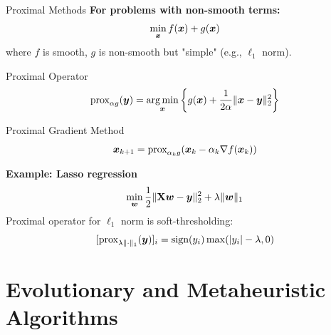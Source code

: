 \documentclass[aspectratio=169]{beamer}
\begin{document}
\begin{frame}{Proximal Methods}
  \textbf{For problems with non-smooth terms:}
  $$\min_{\boldsymbol{x}} f(\boldsymbol{x}) + g(\boldsymbol{x})$$
  where $f$ is smooth, $g$ is non-smooth but "simple" (e.g., $\ell_1$ norm).

  \vspace{0.5em}

  \begin{definitionbox}{Proximal Operator}
    $$\text{prox}_{\alpha g}(\boldsymbol{y}) = \operatorname*{arg\,min}_{\boldsymbol{x}} \left\{g(\boldsymbol{x}) + \frac{1}{2\alpha}\|\boldsymbol{x} - \boldsymbol{y}\|_2^2\right\}$$
  \end{definitionbox}

  \vspace{0.5em}

  \begin{definitionbox}{Proximal Gradient Method}
    $$\boldsymbol{x}_{k+1} = \text{prox}_{\alpha_k g}(\boldsymbol{x}_k - \alpha_k \nabla f(\boldsymbol{x}_k))$$
  \end{definitionbox}

  \vspace{0.5em}

  \textbf{Example: Lasso regression}
  $$\min_{\boldsymbol{w}} \frac{1}{2}\|\mathbf{X}\boldsymbol{w} - \boldsymbol{y}\|_2^2 + \lambda \|\boldsymbol{w}\|_1$$
  Proximal operator for $\ell_1$ norm is soft-thresholding:
  $$[\text{prox}_{\lambda \|\cdot\|_1}(\boldsymbol{y})]_i = \text{sign}(y_i) \max(|y_i| - \lambda, 0)$$
\end{frame}

\section{Evolutionary and Metaheuristic Algorithms}
\end{document}
